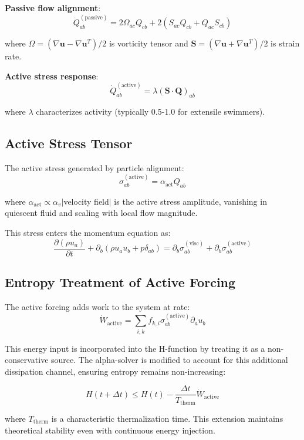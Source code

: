 \textbf{Passive flow alignment}:
\begin{equation}
\dot{Q}_{ab}^{(\mathrm{passive})} = 2\Omega_{ac} Q_{cb} + 2(S_{ac} Q_{cb} + Q_{ac} S_{cb})
\end{equation}

where $\Omega = (\nabla\mathbf{u} - \nabla\mathbf{u}^T)/2$ is vorticity tensor and $\mathbf{S} = (\nabla\mathbf{u} + \nabla\mathbf{u}^T)/2$ is strain rate.

\textbf{Active stress response}:
\begin{equation}
\dot{Q}_{ab}^{(\mathrm{active})} = \lambda(\mathbf{S} \cdot \mathbf{Q})_{ab}
\end{equation}

where $\lambda$ characterizes activity (typically 0.5-1.0 for extensile swimmers).

\subsection{Active Stress Tensor}

The active stress generated by particle alignment:
\begin{equation}
\sigma_{ab}^{(\mathrm{active})} = \alpha_{\mathrm{act}} Q_{ab}
\end{equation}

where $\alpha_{\mathrm{act}} \propto \alpha_v |$velocity field$|$ is the active stress amplitude, vanishing in quiescent fluid and scaling with local flow magnitude.

This stress enters the momentum equation as:
\begin{equation}
\frac{\partial(\rho u_a)}{\partial t} + \partial_b(\rho u_a u_b + p\delta_{ab}) = \partial_b \sigma_{ab}^{(\mathrm{visc})} + \partial_b \sigma_{ab}^{(\mathrm{active})}
\end{equation}

\subsection{Entropy Treatment of Active Forcing}

The active forcing adds work to the system at rate:
\begin{equation}
\dot{W}_{\mathrm{active}} = \sum_{i,k} f_{k,i} \sigma_{ab}^{(\mathrm{active})} \partial_a u_b
\end{equation}

This energy input is incorporated into the H-function by treating it as a non-conservative source. The alpha-solver is modified to account for this additional dissipation channel, ensuring entropy remains non-increasing:

\begin{equation}
H(t+\Delta t) \leq H(t) - \frac{\Delta t}{T_{\text{therm}}} \dot{W}_{\mathrm{active}}
\end{equation}

where $T_{\text{therm}}$ is a characteristic thermalization time. This extension maintains theoretical stability even with continuous energy injection.
